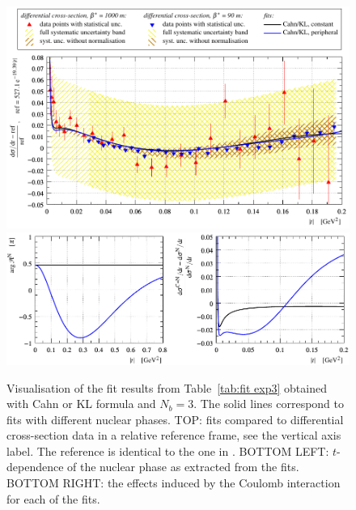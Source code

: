 \begin{figure}
\begin{center}
\includegraphics{fig/fit_exp3/t_dist_rel_with_fit.pdf}
\includegraphics{fig/fit_exp3/phase_cni_effect.pdf}
\caption{Visualisation of the fit results from Table~\ref{tab:fit exp3} obtained with Cahn or KL formula and $N_b=3$. The solid lines correspond to fits with different nuclear phases.
TOP: fits compared to differential cross-section data in a relative reference frame, see the vertical axis label. The reference is identical to the one in \cite{8tev-90m}. 
BOTTOM LEFT: $t$-dependence of the nuclear phase as extracted from the fits.
BOTTOM RIGHT: the effects induced by the Coulomb interaction for each of the fits.
}%
\label{fig:fit exp3}
\end{center}
\end{figure}


